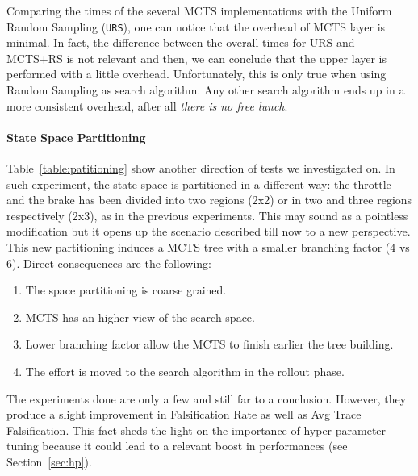 \documentclass[11pt]{article}
\begin{document}
Comparing the times of the several MCTS implementations with the Uniform Random Sampling (\texttt{URS}), one can notice that the overhead of MCTS layer is minimal. In fact, the difference between the overall times for URS and MCTS+RS is not relevant and then, we can conclude that the upper layer is performed with a little overhead. 
Unfortunately, this is only true when using Random Sampling as search algorithm. Any other search algorithm ends up in a more consistent overhead, after all \textit{there is no free lunch}. 

\paragraph{State Space Partitioning}
Table~\ref{table:patitioning} show another direction of tests we investigated on. In such experiment, the state space is partitioned in a different way: the throttle and the brake has been divided into two regions (2x2) or in two and three regions respectively (2x3), as in the previous experiments.
This may sound as a pointless modification but it opens up the scenario described till now to a new perspective.
This new partitioning induces a MCTS tree with a smaller branching factor ($4$ vs $6$). Direct consequences are the following:
\begin{enumerate}
    \item The space partitioning is coarse grained.
    \item MCTS has an higher view of the search space.
    \item Lower branching factor allow the MCTS to finish earlier the tree building.
    \item The effort is moved to the search algorithm in the rollout phase.
\end{enumerate}

The experiments done are only a few and still far to a conclusion. However, they produce a slight improvement in Falsification Rate as well as Avg Trace Falsification. This fact sheds the light on the importance of hyper-parameter tuning because it could lead to a relevant boost in performances (see Section~\ref{sec:hp}).

\end{document}
